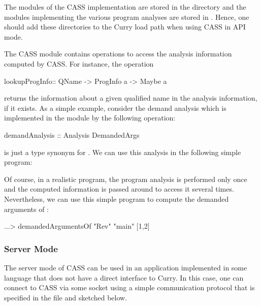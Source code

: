 The modules of the CASS implementation are stored in the directory
 and the modules implementing
the various program analyses are stored in
.
Hence, one should add these directories to the Curry load path
when using CASS in API mode.

The CASS module  contains operations
to access the analysis information computed by CASS.
For instance, the operation
\begin{curry}
lookupProgInfo:: QName -> ProgInfo a -> Maybe a
\end{curry}
returns the information about a given qualified name in the
analysis information, if it exists.
As a simple example, consider the demand analysis which is implemented
in the module  by the following operation:
\begin{curry}
demandAnalysis :: Analysis DemandedArgs
\end{curry}
 is just a type synonym for \code{[Int]}.
We can use this analysis in the following simple program:
Of course, in a realistic program, the program analysis
is performed only once and the computed information 
is passed around to access it several times.
Nevertheless, we can use this simple program to compute the
demanded arguments of :
\begin{curry}
$\ldots$> demandedArgumentsOf "Rev" "main"
[1,2]
\end{curry}


\subsubsection{Server Mode}

The server mode of CASS can be used in an application implemented in
some language that does not have a direct interface to Curry.
In this case, one can connect to CASS via
some socket using a simple communication protocol that is specified
in the file  and sketched below.

